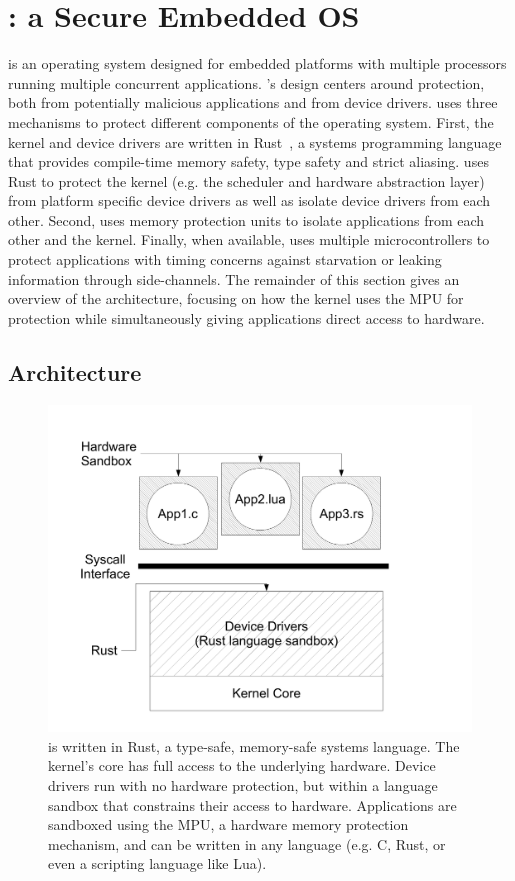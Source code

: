 \section{\name: a Secure Embedded OS}
\label{sec:os}

\name is an operating system  designed for embedded platforms
with multiple processors running multiple concurrent applications.
\name's design centers around protection, both from potentially
malicious applications and from device drivers. \name uses three
mechanisms to protect different components of the operating
system. First, the kernel and device drivers are written in Rust~\cite{rust}, 
a systems programming language that provides compile-time memory safety, 
type safety and
strict aliasing. \name uses Rust to protect the kernel (e.g. the
scheduler and hardware abstraction layer) from platform specific
device drivers as well as isolate device drivers from each other. 
Second, \name uses memory protection units
 to isolate applications from each other and
the kernel. Finally, when available, \name uses multiple microcontrollers to
protect applications with timing concerns against starvation or leaking
information through side-channels. The remainder of this section gives an
overview of the \name architecture, focusing on how the kernel uses the
MPU for protection while simultaneously giving applications direct access
to hardware.

\subsection{Architecture}
\label{sec:os-arch}

\begin{figure}
 \centering
\includegraphics[width=1\columnwidth]{img/architecture}
\caption{\name is written in Rust, a type-safe, memory-safe systems language.
The \name kernel's core has full access to the underlying hardware. Device
drivers run with no hardware protection, but within a language sandbox that
constrains their access to hardware. Applications are sandboxed using the MPU, a
hardware memory protection mechanism, and can be written in any language (e.g.
C, Rust, or even a scripting language like Lua).}
\label{fig:architecture}
\end{figure}

